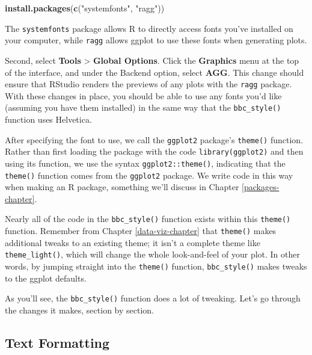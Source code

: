 \documentclass[
]{book}
\newenvironment{Shaded}{\begin{snugshade}}{\end{snugshade}}
\newcommand{\FunctionTok}[1]{\textcolor[rgb]{0.13,0.29,0.53}{\textbf{#1}}}
\newcommand{\NormalTok}[1]{#1}
\newcommand{\StringTok}[1]{\textcolor[rgb]{0.31,0.60,0.02}{#1}}
\begin{document}
\begin{Shaded}
\begin{Highlighting}[]
\FunctionTok{install.packages}\NormalTok{(}\FunctionTok{c}\NormalTok{(}\StringTok{"systemfonts"}\NormalTok{, }\StringTok{"ragg"}\NormalTok{))}
\end{Highlighting}
\end{Shaded}

The \texttt{systemfonts} package allows R to directly access fonts you've installed on your computer, while \texttt{ragg} allows ggplot to use these fonts when generating plots.

Second, select \textbf{Tools} \textgreater{} \textbf{Global Options}. Click the \textbf{Graphics} menu at the top of the interface, and under the Backend option, select \textbf{AGG}. This change should ensure that RStudio renders the previews of any plots with the \texttt{ragg} package. With these changes in place, you should be able to use any fonts you'd like (assuming you have them installed) in the same way that the \texttt{bbc\_style()} function uses Helvetica.

After specifying the font to use, we call the \texttt{ggplot2} package's \texttt{theme()} function. Rather than first loading the package with the code \texttt{library(ggplot2)} and then using its function, we use the syntax \texttt{ggplot2::theme()}, indicating that the \texttt{theme()} function comes from the \texttt{ggplot2} package. We write code in this way when making an R package, something we'll discuss in Chapter \ref{packages-chapter}.

Nearly all of the code in the \texttt{bbc\_style()} function exists within this \texttt{theme()} function. Remember from Chapter \ref{data-viz-chapter} that \texttt{theme()} makes additional tweaks to an existing theme; it isn't a complete theme like \texttt{theme\_light()}, which will change the whole look-and-feel of your plot. In other words, by jumping straight into the \texttt{theme()} function, \texttt{bbc\_style()} makes tweaks to the ggplot defaults.

As you'll see, the \texttt{bbc\_style()} function does a lot of tweaking. Let's go through the changes it makes, section by section.

\hypertarget{text-formatting}{%
\subsection*{Text Formatting}\label{text-formatting}}
\end{document}
